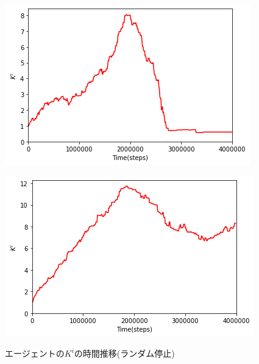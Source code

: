 \documentclass[12pt,a4j,twoside]{jarticle}
\begin{document}
  \begin{figure}
    \begin{minipage}{0.48\hsize}
      \centering
      \includegraphics[width=0.99\hsize]{figures/CorrectionTransition_RandomStop_10.png}
      \label{subfig:transition_random_10}
    \end{minipage}
    \hfill
    \begin{minipage}{0.48\hsize}
      \centering
      \includegraphics[width=0.99\hsize]{figures/CorrectionTransition_RandomStop_7.png}
      \label{subfig:transition_random_7}
    \end{minipage}
    \caption{エージェントの$K^i$の時間推移(ランダム停止)}
    \label{fig:transition_randomStop}
  \end{figure}
\end{document}
